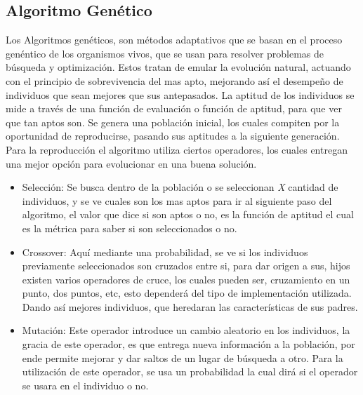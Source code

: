 \documentclass[letter, 10pt]{article}
\begin{document}
\subsection{Algoritmo Gen\'etico}
Los Algoritmos gen\'eticos, son m\'etodos adaptativos que se basan en el proceso gen\'entico de los organismos vivos, que se usan para resolver 
problemas de b\'usqueda y optimizaci\'on. Estos tratan de emular la evoluci\'on natural, actuando con el principio de sobrevivencia del mas apto, 
mejorando as\'i el desempe\~no de individuos que sean mejores que sus antepasados. La aptitud de los individuos se mide a trav\'es de una funci\'on de
evaluaci\'on o funci\'on de aptitud, para que ver que tan aptos son. Se genera una poblaci\'on inicial, los cuales compiten por la oportunidad de
reproducirse, pasando sus aptitudes a la siguiente generaci\'on. Para la reproducci\'on el algoritmo utiliza ciertos operadores, los cuales entregan 
una mejor opci\'on para evolucionar en una buena soluci\'on.\cite{whitepaper}
\begin{itemize}
 \item Selecci\'on: Se busca dentro de la poblaci\'on o se seleccionan \emph{X} cantidad de individuos, y se ve cuales son los mas aptos para ir al 
 siguiente paso del algoritmo, el valor que dice si son aptos o no, es la funci\'on de aptitud el cual es la m\'etrica para saber si 
 son seleccionados o no.\cite{whitepaper}
 \item Crossover: Aqu\'i mediante una probabilidad, se ve si los individuos previamente seleccionados son cruzados entre si, para dar origen a sus,
 hijos existen varios operadores de cruce, los cuales pueden ser, cruzamiento en un punto, dos puntos, etc, esto depender\'a del 
 tipo de implementaci\'on utilizada. Dando as\'i mejores individuos, que heredaran las caracter\'isticas de sus padres.\cite{whitepaper}
 \item Mutaci\'on: Este operador introduce un cambio aleatorio en los individuos, la gracia de este operador, es que entrega nueva informaci\'on a la 
 poblaci\'on, por ende permite mejorar y dar saltos de un lugar de b\'usqueda a otro. Para la utilizaci\'on de este operador, se usa un probabilidad 
 la cual dir\'a si el operador se usara en el individuo o no.\cite{whitepaper}
\end{itemize}
\end{document}
